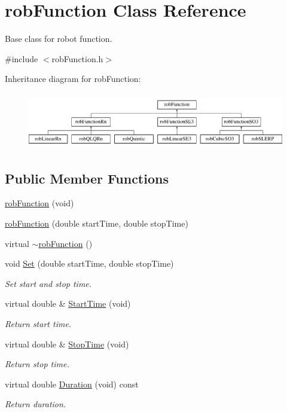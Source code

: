 \hypertarget{classrob_function}{}\section{rob\+Function Class Reference}
\label{classrob_function}


Base class for robot function.  




{\ttfamily \#include $<$rob\+Function.\+h$>$}

Inheritance diagram for rob\+Function\+:\begin{figure}[H]
\begin{center}
\leavevmode
\includegraphics[height=2.477876cm]{df/d7c/classrob_function}
\end{center}
\end{figure}
\subsection*{Public Member Functions}
\begin{DoxyCompactItemize}
\item 
\hyperlink{classrob_function_a87a3a5ba5776e3ebe18ec09ddea761d2}{rob\+Function} (void)
\item 
\hyperlink{classrob_function_a92c4ae2aa08b0f2e45fcd22b42bb4b2f}{rob\+Function} (double start\+Time, double stop\+Time)
\item 
virtual \hyperlink{classrob_function_aa0047e53fa345aaf5742f804cbdf036c}{$\sim$rob\+Function} ()
\item 
void \hyperlink{classrob_function_ab6c969d6c132e52e313db685735bd02b}{Set} (double start\+Time, double stop\+Time)
\begin{DoxyCompactList}\small\item\em Set start and stop time. \end{DoxyCompactList}\item 
virtual double \& \hyperlink{classrob_function_a7cc9c026519df2585f917c032464cdc7}{Start\+Time} (void)
\begin{DoxyCompactList}\small\item\em Return start time. \end{DoxyCompactList}\item 
virtual double \& \hyperlink{classrob_function_a1d71358b3cad6ed57998fc3d27add1e6}{Stop\+Time} (void)
\begin{DoxyCompactList}\small\item\em Return stop time. \end{DoxyCompactList}\item 
virtual double \hyperlink{classrob_function_a9a3f87b9233377bef2ad36f346849f67}{Duration} (void) const 
\begin{DoxyCompactList}\small\item\em Return duration. \end{DoxyCompactList}\end{DoxyCompactItemize}
